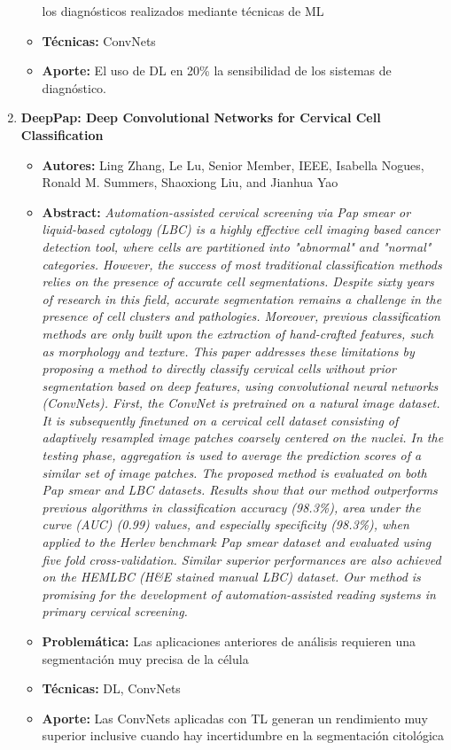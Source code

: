 \begin{enumerate}[label=\textbf{\arabic*}]
\begin{itemize}
        los diagnósticos realizados mediante técnicas de ML
        \item{\textbf{Técnicas:}} ConvNets
        \item{\textbf{Aporte:}} El uso de DL en 20\% la
        sensibilidad de los sistemas de diagnóstico.
    \end{itemize}
    \item \textbf{DeepPap: Deep Convolutional Networks for Cervical Cell Classification}~\cite{Zhang2017}
    \begin{itemize} 
        \item{\textbf{Autores:}} Ling Zhang, Le Lu, Senior Member, IEEE,
        Isabella Nogues, Ronald M. Summers, Shaoxiong Liu, and Jianhua Yao
        \item{\textbf{Abstract:}} \textit{Automation-assisted cervical screening via Pap smear or liquid-based cytology (LBC) is a highly effective cell imaging based cancer detection tool, where cells are partitioned into "abnormal" and "normal" categories. However, the success of most traditional classification methods relies on the presence of accurate cell segmentations. Despite sixty years of research in this field, accurate segmentation remains a challenge in the presence of cell clusters and pathologies. Moreover, previous classification methods are only built upon the extraction of hand-crafted features, such as morphology and texture. This paper addresses these limitations by proposing a method to directly classify cervical cells without prior segmentation based on deep features, using convolutional neural networks (ConvNets). First, the ConvNet is pretrained on a natural image dataset. It is subsequently finetuned on a cervical cell dataset consisting of adaptively resampled image patches coarsely centered on the nuclei. In the testing phase, aggregation is used to average the prediction scores of a similar set of image patches. The proposed method is evaluated on both Pap smear and LBC datasets. Results show that our method outperforms previous algorithms in classification accuracy (98.3\%), area under the curve (AUC) (0.99) values, and especially specificity (98.3\%), when applied to the Herlev benchmark Pap smear dataset and evaluated using five fold cross-validation. Similar superior performances are also achieved on the HEMLBC (H\&E stained manual LBC) dataset. Our method is promising for the development of automation-assisted reading systems in primary cervical screening.}
        \item{\textbf{Problemática:}} Las aplicaciones anteriores de análisis
        requieren una segmentación muy precisa de la célula
        \item{\textbf{Técnicas:}} DL, ConvNets
        \item{\textbf{Aporte:}} Las ConvNets aplicadas con TL generan un
        rendimiento muy superior inclusive cuando hay incertidumbre en la
        segmentación citológica
    \end{itemize}
\end{enumerate}


